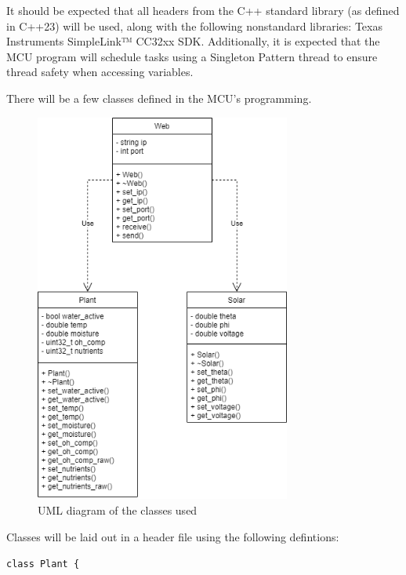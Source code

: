 \begin{flushleft}
    It should be expected that all headers from the C++ standard library (as
    defined in C++23) will be used, along with the following nonstandard
    libraries: Texas Instruments SimpleLink™ CC32xx SDK. Additionally, it is
    expected that the MCU program will schedule tasks using a Singleton Pattern
    thread to ensure thread safety when accessing variables.
\end{flushleft}
\begin{flushleft}
    There will be a few classes defined in the MCU's programming.
    \begin{figure}[H]
        \label{classes_uml}
        \caption{UML diagram of the classes used}
        \centering
        \includegraphics[width=0.75\textwidth]{images/classes_uml.png}
    \end{figure}
    Classes will be laid out in a header file using the following defintions:
    \begin{flushleft}
        \texttt{class Plant \{}  \\

\end{flushleft}
\end{flushleft}
